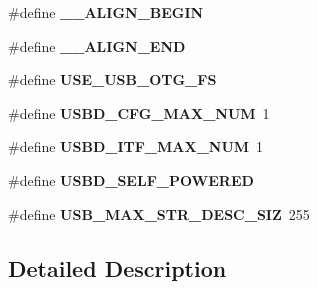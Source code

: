 \begin{DoxyCompactItemize}
\item 
\hypertarget{group__USB__CONF__Exported__Defines_ga8b374c2c4c44e27335ab7bca651371f8}{\#define {\bfseries \-\_\-\-\_\-\-A\-L\-I\-G\-N\-\_\-\-B\-E\-G\-I\-N}}\label{group__USB__CONF__Exported__Defines_ga8b374c2c4c44e27335ab7bca651371f8}

\item 
\hypertarget{group__USB__CONF__Exported__Defines_gaaa12b03c58e2eb296bd7aa915ee540f3}{\#define {\bfseries \-\_\-\-\_\-\-A\-L\-I\-G\-N\-\_\-\-E\-N\-D}}\label{group__USB__CONF__Exported__Defines_gaaa12b03c58e2eb296bd7aa915ee540f3}

\item 
\hypertarget{group__USB__CONF__Exported__Defines_ga05fe8f364b0f99dddedd65322b6ed290}{\#define {\bfseries U\-S\-E\-\_\-\-U\-S\-B\-\_\-\-O\-T\-G\-\_\-\-F\-S}}\label{group__USB__CONF__Exported__Defines_ga05fe8f364b0f99dddedd65322b6ed290}

\item 
\hypertarget{group__USB__CONF__Exported__Defines_ga0f61d1e368881f51a9ef8f7a69c1cf48}{\#define {\bfseries U\-S\-B\-D\-\_\-\-C\-F\-G\-\_\-\-M\-A\-X\-\_\-\-N\-U\-M}~1}\label{group__USB__CONF__Exported__Defines_ga0f61d1e368881f51a9ef8f7a69c1cf48}

\item 
\hypertarget{group__USB__CONF__Exported__Defines_ga962954e781fa629ed9671612cb3434a5}{\#define {\bfseries U\-S\-B\-D\-\_\-\-I\-T\-F\-\_\-\-M\-A\-X\-\_\-\-N\-U\-M}~1}\label{group__USB__CONF__Exported__Defines_ga962954e781fa629ed9671612cb3434a5}

\item 
\hypertarget{group__USB__CONF__Exported__Defines_ga07065dc40f090f051dd1dd6d5901930a}{\#define {\bfseries U\-S\-B\-D\-\_\-\-S\-E\-L\-F\-\_\-\-P\-O\-W\-E\-R\-E\-D}}\label{group__USB__CONF__Exported__Defines_ga07065dc40f090f051dd1dd6d5901930a}

\item 
\hypertarget{group__USB__CONF__Exported__Defines_ga4a6dafc48f312f5b8c6378d1a2dc564b}{\#define {\bfseries U\-S\-B\-\_\-\-M\-A\-X\-\_\-\-S\-T\-R\-\_\-\-D\-E\-S\-C\-\_\-\-S\-I\-Z}~255}\label{group__USB__CONF__Exported__Defines_ga4a6dafc48f312f5b8c6378d1a2dc564b}

\end{DoxyCompactItemize}


\subsection{Detailed Description}
